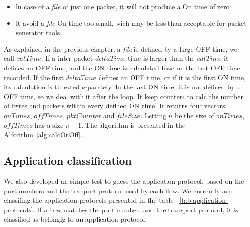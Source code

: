 \begin{itemize}
\item In case of a \textit{file} of just one packet, it will not produce a On time of zero
\item It avoid a \textit{file} On time too small, wich may be less than acceptable for packet generator tools.
\end{itemize}

As explained in the previous chapter, a \textit{file} is defined by a large OFF time, we call $cutTime$. If a inter packet $deltaTime$ time is larger than the $cutTime$ it defines an OFF time, and the ON time is calculated base on the last OFF time recorded. 
If the first $deltaTime$ defines an OFF time, or if it is the first ON time, its calculation is threated separetely. In the last ON time, it is not defined by an OFF time, so we deal with it after the loop. It keep counters to calc the number of bytes and packets within every defined ON time. It returns four vectors: $onTimes$, $offTimes$, $pktCounter$ and $fileSize$. Letting $n$ be the size of $onTimes$,  $offTimes$ has a size $n - 1$. The algorithm is presented in the Alforithm~\ref{alg:calcOnOff}.


\subsection{Application classification}


We also developed an simple test to guess the application protocol, based on the port numbers and the tranport protocol used by each flow. We currently are classifing the application protocols presented in the table ~\ref{tab:application-protocols}. If a flow matches the port number, and the transport protocol, it is classified as belongig to an application protocol.


%		
%		
%		
%		
%
%
%


